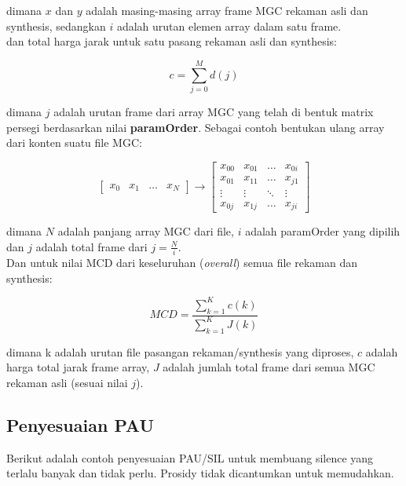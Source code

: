 \documentclass[12pt,]{article}
\begin{document}
	dimana $x$ dan $y$ adalah masing-masing array frame MGC rekaman asli dan synthesis,
	sedangkan $i$ adalah urutan elemen array dalam satu frame.\\

	dan total harga jarak untuk satu pasang rekaman asli dan synthesis:

	\begin{equation}
		c = \sum_{j=0}^{M} d(j)
	\end{equation}

	dimana $j$ adalah urutan frame dari array MGC yang telah di bentuk matrix persegi berdasarkan nilai \textbf{paramOrder}.
	Sebagai contoh bentukan ulang array dari konten suatu file MGC:

	\[
		\begin{bmatrix}
			x_{0} & x_{1} & \dots & x_{N}
		\end{bmatrix}
		\rightarrow
		\begin{bmatrix}
			x_{00} & x_{01} & \dots & x_{0i} \\
			x_{01} & x_{11} & \dots & x_{j1} \\
			\vdots & \vdots & \ddots & \vdots \\
			x_{0j} & x_{1j} & \dots & x_{ji}
		\end{bmatrix}
	\]

	dimana $N$ adalah panjang array MGC dari file, $i$ adalah paramOrder yang dipilih dan $j$ adalah total frame dari $j=\frac{N}{i}$.\\

	\newpage
	Dan untuk nilai MCD dari keseluruhan (\textit{overall}) semua file rekaman dan synthesis:

	\begin{equation}
		MCD = \frac{\sum_{k=1}^{K} c(k)}{\sum_{k=1}^{K} J(k)}
	\end{equation}

	dimana k adalah urutan file pasangan rekaman/synthesis yang diproses,
	$c$ adalah harga total jarak frame array,
	$J$ adalah jumlah total frame dari semua MGC rekaman asli (sesuai nilai $j$).

	\subsection{Penyesuaian PAU}

	Berikut adalah contoh penyesuaian PAU/SIL untuk membuang silence yang terlalu banyak dan tidak perlu.
	Prosidy tidak dicantumkan untuk memudahkan.
\end{document}
